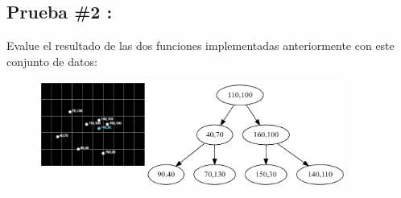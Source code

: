 \subsection{Prueba \#2 :}
Evalue el resultado de las dos funciones implementadas anteriormente con este conjunto de datos:\\

\begin{figure}[H]
 \centering
 \includegraphics[width=0.9\textwidth]{images/prueba2.PNG}
 \label{fig:act-5-prueba2}
\end{figure}

